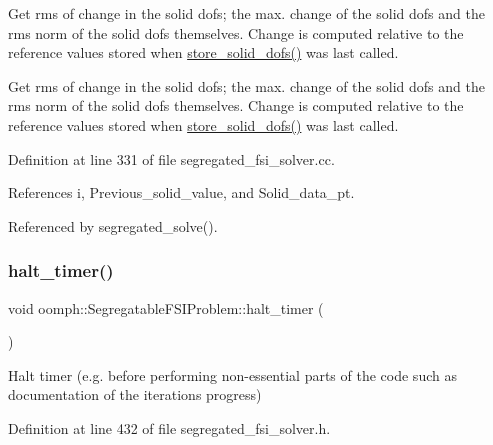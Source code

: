 Get rms of change in the solid dofs; the max. change of the solid dofs and the rms norm of the solid dofs themselves. Change is computed relative to the reference values stored when \hyperlink{classoomph_1_1SegregatableFSIProblem_af6a9e7b6f13b86bf86b65cfb7c4f966f}{store\+\_\+solid\+\_\+dofs()} was last called. 

Get rms of change in the solid dofs; the max. change of the solid dofs and the rms norm of the solid dofs themselves. Change is computed relative to the reference values stored when \hyperlink{classoomph_1_1SegregatableFSIProblem_af6a9e7b6f13b86bf86b65cfb7c4f966f}{store\+\_\+solid\+\_\+dofs()} was last called. 

Definition at line 331 of file segregated\+\_\+fsi\+\_\+solver.\+cc.



References i, Previous\+\_\+solid\+\_\+value, and Solid\+\_\+data\+\_\+pt.



Referenced by segregated\+\_\+solve().

\mbox{\label{classoomph_1_1SegregatableFSIProblem_a6282056a5c22b707a1e6c939a3f73dcd}} 
\subsubsection{\texorpdfstring{halt\+\_\+timer()}{halt\_timer()}}
{\footnotesize\ttfamily void oomph\+::\+Segregatable\+F\+S\+I\+Problem\+::halt\+\_\+timer (\begin{DoxyParamCaption}{ }\end{DoxyParamCaption})\hspace{0.3cm}{\ttfamily [inline]}}



Halt timer (e.\+g. before performing non-\/essential parts of the code such as documentation of the iteration\textquotesingle{}s progress) 



Definition at line 432 of file segregated\+\_\+fsi\+\_\+solver.\+h.

\mbox{\label{classoomph_1_1SegregatableFSIProblem_a60f719990547949019c8645a4b3a6c6e}} 
